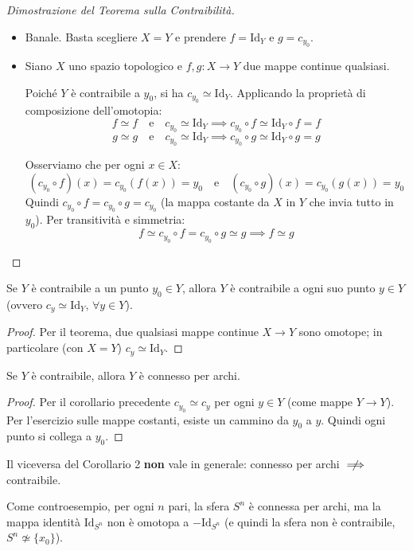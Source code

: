 \begin{proof}[Dimostrazione del Teorema sulla Contraibilità]
\begin{itemize}
    \item[$\impliedby$)] Banale. Basta scegliere $X = Y$ e prendere $f = \mathrm{Id}_Y$ e $g = c_{y_0}$.
    \item[$\implies$)] Siano $X$ uno spazio topologico e $f, g: X \to Y$ due mappe continue qualsiasi.
    
    Poiché $Y$ è contraibile a $y_0$, si ha $c_{y_0} \simeq \mathrm{Id}_Y$. Applicando la proprietà di composizione dell'omotopia:
    \[
    f \simeq f \quad \text{e} \quad c_{y_0} \simeq \mathrm{Id}_Y \implies c_{y_0} \circ f \simeq \mathrm{Id}_Y \circ f = f
    \]
    \[
    g \simeq g \quad \text{e} \quad c_{y_0} \simeq \mathrm{Id}_Y \implies c_{y_0} \circ g \simeq \mathrm{Id}_Y \circ g = g
    \]
    
    Osserviamo che per ogni $x \in X$:
    \[
    (c_{y_0} \circ f)(x) = c_{y_0}(f(x)) = y_0 \quad \text{e} \quad (c_{y_0} \circ g)(x) = c_{y_0}(g(x)) = y_0
    \]
    Quindi $c_{y_0} \circ f = c_{y_0} \circ g = c_{y_0}$ (la mappa costante da $X$ in $Y$ che invia tutto in $y_0$). Per transitività e simmetria:
    \[
    f \simeq c_{y_0} \circ f = c_{y_0} \circ g \simeq g \implies f \simeq g
    \]
\end{itemize}
\end{proof}

\begin{coro}
Se $Y$ è contraibile a un punto $y_0 \in Y$, allora $Y$ è contraibile a ogni suo punto $y \in Y$ (ovvero $c_y \simeq \mathrm{Id}_Y, \, \forall y \in Y$).
\end{coro}
\begin{proof}
Per il teorema, due qualsiasi mappe continue $X \to Y$ sono omotope; in particolare (con $X = Y$) $c_y \simeq \mathrm{Id}_Y$.
\end{proof}

\begin{coro}
Se $Y$ è contraibile, allora $Y$ è connesso per archi.
\end{coro}
\begin{proof}
Per il corollario precedente $c_{y_0} \simeq c_{y}$ per ogni $y \in Y$ (come mappe $Y \to Y$). Per l'esercizio sulle mappe costanti, esiste un cammino da $y_0$ a $y$. Quindi ogni punto si collega a $y_0$.
\end{proof}

\begin{observacion}
Il viceversa del Corollario 2 \textbf{non} vale in generale: connesso per archi $\centernot\implies$ contraibile.

Come controesempio, per ogni $n$ pari, la sfera $S^n$ è connessa per archi, ma la mappa identità $\mathrm{Id}_{S^n}$ non è omotopa a $-\mathrm{Id}_{S^n}$ (e quindi la sfera non è contraibile, $S^n \not\simeq \{x_0\}$).
\end{observacion}

